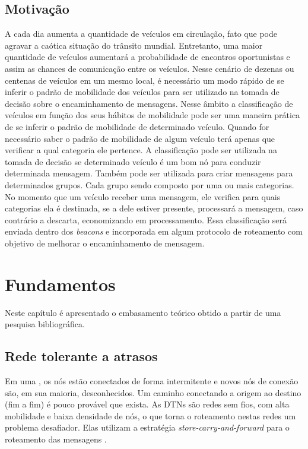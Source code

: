 \documentclass[mestrado, pre-defesa, english, brazil]{packages/icmc}
\begin{document}
\section{Motivação} \label{motivacao}

A cada dia aumenta a quantidade de veículos em circulação, fato que pode agravar a caótica situação do trânsito mundial. Entretanto, uma maior quantidade de veículos aumentará a probabilidade de encontros oportunistas e assim as chances de comunicação entre os veículos. Nesse cenário de dezenas ou centenas de veículos em um mesmo local, é necessário um modo rápido de se inferir o padrão de mobilidade dos veículos para ser utilizado na tomada de decisão sobre o encaminhamento de mensagens. Nesse âmbito a classificação de veículos em função dos seus hábitos de mobilidade pode ser uma maneira prática de se inferir o padrão de mobilidade de determinado veículo. Quando for necessário saber o padrão de mobilidade de algum veículo terá apenas que verificar a qual categoria ele pertence. A classificação pode ser utilizada na tomada de decisão se determinado veículo é um bom nó para conduzir determinada mensagem. Também pode ser utilizada para criar mensagens para determinados grupos. Cada grupo sendo composto por uma ou mais categorias. No momento que um veículo receber uma mensagem, ele verifica para quais categorias ela é destinada, se a dele estiver presente, processará a mensagem, caso contrário a descarta, economizando em processamento. Essa classificação será enviada dentro dos \textit{beacons} e incorporada em algum protocolo de roteamento com objetivo de melhorar o encaminhamento de mensagem.

\chapter{Fundamentos} \label{fundamentos}

Neste capítulo é apresentado o embasamento teórico obtido a partir de uma pesquisa bibliográfica.

\section{Rede tolerante a atrasos} \label{dtn}

Em uma , os nós estão conectados de forma intermitente e novos nós de conexão são, em sua maioria, desconhecidos. Um caminho conectando a origem ao destino (fim a fim) é pouco provável que exista. As DTNs são redes sem fios, com alta mobilidade e baixa densidade de nós, o que torna o roteamento nestas redes um problema desafiador. Elas utilizam a estratégia \textit{store-carry-and-forward} para o roteamento das mensagens \cite{Jain-2004, Bulut-2010}.
\end{document}
